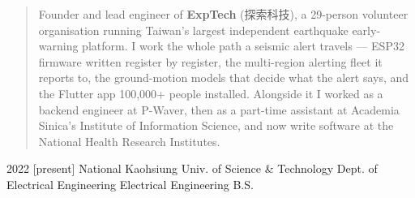 \documentclass{resume}
\begin{document}
\makeheader

\begin{abstract}
Founder and lead engineer of \textbf{ExpTech} (探索科技), a 29-person volunteer organisation running
Taiwan's largest independent earthquake early-warning platform. I work the whole path a seismic alert
travels --- ESP32 firmware written register by register, the multi-region alerting fleet it reports to, the
ground-motion models that decide what the alert says, and the Flutter app 100,000+ people installed.
Alongside it I worked as a backend engineer at P-Waver, then as a part-time assistant at Academia
Sinica's Institute of Information Science, and now write software at the National Health Research Institutes.
\end{abstract}

\begin{competences}[9em]
\end{competences}

\begin{educations}
  \education%
    {2022}%
    [present]%
    {National Kaohsiung Univ. of Science \& Technology}%
    {Dept. of Electrical Engineering}%
    {Electrical Engineering}%
    {B.S.}
\end{educations}
\end{document}
